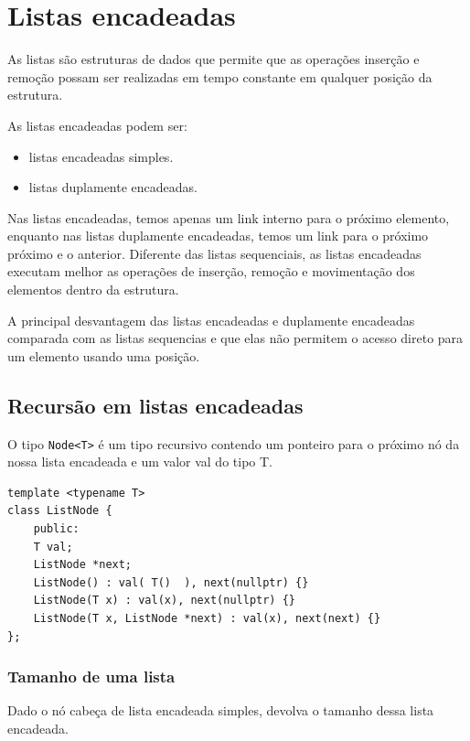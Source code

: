 \chapter{Listas encadeadas}


As listas são estruturas de dados que permite que as operações inserção e remoção possam ser realizadas em tempo constante em qualquer posição da estrutura. 

As listas encadeadas podem ser:

\begin{itemize}
\item listas encadeadas simples.
\item listas duplamente encadeadas.
\end{itemize}


Nas listas encadeadas, temos apenas um link interno para o próximo elemento, enquanto nas listas duplamente encadeadas, temos um link para o próximo próximo e o anterior. Diferente das listas sequenciais, as listas encadeadas executam melhor as operações de inserção, remoção e movimentação dos elementos dentro da estrutura.

A principal desvantagem das listas encadeadas e duplamente encadeadas comparada com as listas sequencias e que elas não permitem o acesso direto para um elemento usando uma posição.
 



\section{Recursão em listas encadeadas}

O tipo \texttt{Node<T>} é um tipo recursivo contendo um ponteiro para o próximo nó da nossa lista encadeada e um valor val do tipo T.


\begin{verbatim}
template <typename T>
class ListNode {
    public:
    T val;
    ListNode *next;
    ListNode() : val( T()  ), next(nullptr) {}
    ListNode(T x) : val(x), next(nullptr) {}
    ListNode(T x, ListNode *next) : val(x), next(next) {} 
};
\end{verbatim}



\subsection{Tamanho de uma lista}

Dado o nó cabeça de lista encadeada simples, devolva o tamanho dessa lista encadeada.


